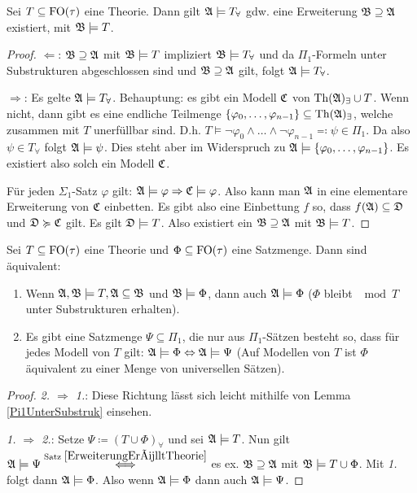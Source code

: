 \begin{satz}
	Sei $T\subseteq \operatorname{FO}(\tau)$ eine Theorie. Dann gilt $\mathfrak{A}\models T_\forall$ gdw. eine Erweiterung $\mathfrak{B}\supseteq\mathfrak{A}$ existiert, mit $\mathfrak{B}\models T$.
	\label{ErweiterungErülltTheorie}
\end{satz}
\begin{proof}
	$\Leftarrow$: $\mathfrak{B}\supseteq\mathfrak{A}$ mit $\mathfrak{B}\models T$ impliziert $\mathfrak{B}\models T_\forall$ und da $\Pi_1$-Formeln unter Substrukturen abgeschlossen sind und $\mathfrak{B}\supseteq\mathfrak{A}$ gilt, folgt $\mathfrak{A}\models T_\forall$.
	
	$\Rightarrow$: Es gelte $\mathfrak{A}\models T_\forall$. Behauptung: es gibt ein Modell $\mathfrak{C}$ von $\operatorname{Th}(\mathfrak{A})_\exists\cup T$. Wenn nicht, dann gibt es eine endliche Teilmenge $\{\varphi_0,\dots,\varphi_{n-1}\}\subseteq \operatorname{Th}(\mathfrak{A})_\exists$, welche zusammen mit $T$ unerfüllbar sind. D.h. $T\models \neg\varphi_0\land\dots\land\neg\varphi_{n-1}\eqqcolon\psi\in\Pi_1$. Da also $\psi\in T_\forall$ folgt $\mathfrak{A}\models\psi$. Dies steht aber im Widerspruch zu $\mathfrak{A}\models\{\varphi_0,\dots,\varphi_{n-1}\}$. Es existiert also solch ein Modell $\mathfrak{C}$.
	
	Für jeden $\Sigma_1$-Satz $\varphi$ gilt: $\mathfrak{A}\models\varphi\Rightarrow\mathfrak{C}\models\varphi$. Also kann man $\mathfrak{A}$ in eine elementare Erweiterung von $\mathfrak{C}$ einbetten. Es gibt also eine Einbettung $f$ so, dass $f(\mathfrak{A})\subseteq\mathfrak{D}$ und $\mathfrak{D}\succcurlyeq\mathfrak{C}$ gilt. Es gilt $\mathfrak{D}\models T$. Also existiert ein $\mathfrak{B}\supseteq\mathfrak{A}$ mit $\mathfrak{B}\models T$.
\end{proof}

\begin{satz}[\L o\'{s}-Tarski]
	Sei $T\subseteq \operatorname{FO}(\tau)$ eine Theorie und $\Phi\subseteq \operatorname{FO}(\tau)$ eine Satzmenge.
	Dann sind äquivalent:
	\begin{enumerate}
		\item Wenn $\mathfrak{A},\mathfrak{B}\models T,\mathfrak{A}\subseteq\mathfrak{B}$ und $\mathfrak{B}\models\Phi$, dann auch $\mathfrak{A}\models\Phi$ ($\Phi$ bleibt $\mod T$ unter Substrukturen erhalten).
		\item Es gibt eine Satzmenge $\Psi\subseteq\Pi_1$, die nur aus $\Pi_1$-Sätzen besteht so, dass für jedes Modell von $T$ gilt: $\mathfrak{A}\models\Phi\Leftrightarrow\mathfrak{A}\models\Psi$ (Auf Modellen von $T$ ist $\Phi$ äquivalent zu einer Menge von universellen Sätzen).
	\end{enumerate}
\end{satz}
\begin{proof}
	\textit{2. $\Rightarrow$ 1.}: Diese Richtung lässt sich leicht mithilfe von Lemma \ref{Pi1UnterSubstruk} einsehen.
	
	\textit{1. $\Rightarrow$ 2.}: Setze $\Psi\coloneqq(T\cup\Phi)_\forall$ und sei $\mathfrak{A}\models T$.
	Nun gilt $\mathfrak{A}\models\Psi \overset{\text{Satz }\ref{ErweiterungErülltTheorie}}{\Longleftrightarrow}$ es ex. $\mathfrak{B}\supseteq\mathfrak{A}$ mit $\mathfrak{B}\models T\cup \Phi$. Mit \textit{1.} folgt dann $\mathfrak{A}\models \Phi$. Also wenn $\mathfrak{A}\models\Phi$ dann auch $\mathfrak{A}\models\Psi$.
\end{proof}

